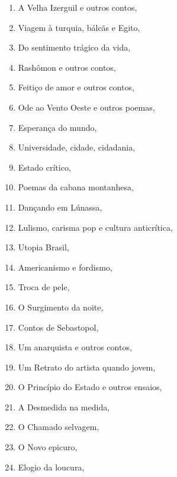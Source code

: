 \begin{multicols}{2}
\begin{enumerate}
\item A Velha Izerguil e outros contos, {}
\item Viagem à turquia, bálcãs e Egito, {}
\item Do sentimento trágico da vida, {}
\item Rashômon e outros contos, {}
\item Feitiço de amor e outros contos, {}
\item Ode ao Vento Oeste e outros poemas, {}
\item Esperança do mundo, {}
\item Universidade, cidade, cidadania, {}
\item Estado crítico, {}
\item Poemas da cabana montanhesa, {}
\item Dançando em Lúnassa, {}
\item Lulismo, carisma pop e cultura anticrítica, {}
\item Utopia Brasil, {}
\item Americanismo e fordismo, {}
\item Troca de pele, {}
\item O Surgimento da noite, {}
\item Contos de Sebastopol, {}
\item Um anarquista e outros contos, {}
\item Um Retrato do artista quando jovem, {}
\item O Princípio do Estado e outros ensaios, {}
\item A Desmedida na medida, {}
\item O Chamado selvagem, {}
\item O Novo epicuro, {}
\item Elogio da loucura, {}

\end{enumerate}
\end{multicols}
